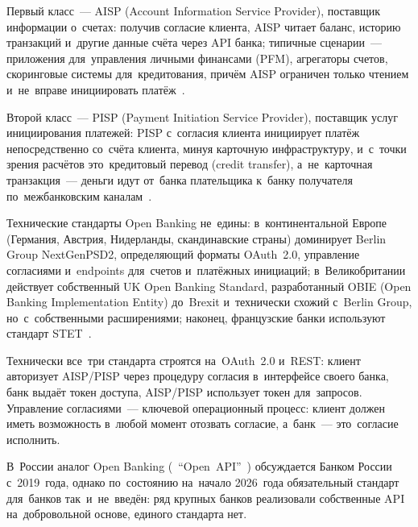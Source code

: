 Первый класс~--- AISP (Account Information Service Provider), поставщик
информации о~счетах: получив согласие клиента, AISP читает баланс,
историю транзакций и~другие данные счёта через API банка; типичные
сценарии~--- приложения для~управления личными финансами (PFM), агрегаторы
счетов, скоринговые системы для~кредитования, причём AISP ограничен
только чтением и~не~вправе инициировать платёж~.

Второй класс~--- PISP (Payment Initiation Service Provider), поставщик
услуг инициирования платежей: PISP с~согласия клиента инициирует
платёж непосредственно со~счёта клиента, минуя карточную инфраструктуру,
и~с~точки зрения расчётов это~кредитовый перевод (credit transfer),
а~не~карточная транзакция~--- деньги идут от~банка плательщика к~банку
получателя по~межбанковским каналам~.

Технические стандарты Open Banking не~едины: в~континентальной Европе
(Германия, Австрия, Нидерланды, скандинавские страны) доминирует
Berlin Group NextGenPSD2, определяющий форматы OAuth~2.0, управление
согласиями и~endpoints для~счетов и~платёжных инициаций;
в~Великобритании действует собственный UK Open Banking Standard,
разработанный OBIE (Open Banking Implementation Entity) до~Brexit
и~технически схожий с~Berlin Group, но~с~собственными расширениями;
наконец, французские банки используют стандарт STET~.

Технически все~три стандарта строятся на~OAuth~2.0 и~REST: клиент
авторизует AISP/PISP через процедуру согласия в~интерфейсе своего банка,
банк выдаёт токен доступа, AISP/PISP использует токен для~запросов.
Управление согласиями~--- ключевой операционный процесс: клиент должен
иметь возможность в~любой момент отозвать согласие, а~банк~--- это~согласие
исполнить.


В~России аналог Open Banking (~\enquote{Open~API}~) обсуждается
Банком России с~2019~года, однако по~состоянию на~начало 2026~года
обязательный стандарт для~банков так~и~не~введён: ряд крупных банков
реализовали собственные API на~добровольной основе, единого стандарта
нет.


